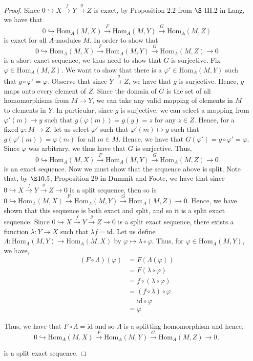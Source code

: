 \documentclass[11pt, reqno]{amsart}
\theoremstyle{plain}
\theoremstyle{definition}
\theoremstyle{example}
\def\Hom{\mathrm{Hom}}
\def\id{\mathrm{id}}
\begin{document}
\begin{proof}
Since $0 \hookrightarrow X \xrightarrow{f} Y \xrightarrow{g} Z$ is exact, by Proposition 2.2 from $\S$ III.2 in Lang, we have that $$0 \hookrightarrow \Hom_A(M,X) \xrightarrow{F} \Hom_A(M, Y) \xrightarrow{G} \Hom_A(M,Z)$$ is exact for all $A$-modules $M$. In order to show that $$0 \hookrightarrow \Hom_A(M,X) \xrightarrow{F} \Hom_A(M, Y) \xrightarrow{G} \Hom_A(M,Z) \to 0$$ is a short exact sequence, we thus need to show that $G$ is surjective. Fix $\varphi \in \Hom_A(M, Z)$. We want to show that there is a $\varphi' \in \Hom_A(M, Y)$ such that $g \circ \varphi' = \varphi$. Observe that since $Y \xrightarrow{g} Z$, we have that $g$ is surjective. Hence, $g$ maps onto every element of $Z$. Since the domain of $G$ is the set of all homomorphisms from $M \to Y$, we can take any valid mapping of elements in $M$ to elements in $Y$. In particular, since $g$ is surjective, we can select a mapping from $\varphi'(m) \mapsto y$ such that $g(\varphi(m)) = g(y) = z$ for any $z \in Z$. Hence, for a fixed $\varphi: M \to Z$, let us select $\varphi'$ such that $\varphi'(m) \mapsto y$ such that $g(\varphi'(m)) = \varphi(m)$ for all $m \in M$. Hence, we have that $G(\varphi')= g \circ \varphi' = \varphi$. Since $\varphi$ was arbitrary, we thus have that $G$ is surjective. Thus, $$0 \hookrightarrow \Hom_A(M,X) \xrightarrow{F} \Hom_A(M, Y) \xrightarrow{G} \Hom_A(M,Z) \to 0$$ is an exact sequence. Now we must show that the sequence above is split. Note that, by $\S 10.5$, Proposition 29 in Dummit and Foote, we have that since $0 \hookrightarrow X \xrightarrow{f} Y \xrightarrow{g} Z \to 0$ is a split sequence, then so is $0 \hookrightarrow \Hom_A(M,X) \xrightarrow{F} \Hom_A(M, Y) \xrightarrow{G} \Hom_A(M,Z) \to 0$. Hence, we have shown that this sequence is both exact and split, and so it is a split exact sequence. Since $0 \hookrightarrow X \xrightarrow{f} Y \xrightarrow{g} Z \to 0$ is a split exact sequence, there exists a function $\lambda: Y \to X$ such that $\lambda f = \id$. Let us define $\Lambda: \Hom_A(M, Y) \to \Hom_A(M, X)$ by $\varphi \mapsto \lambda \circ \varphi$. Thus, for $\varphi \in \Hom_A(M, Y)$, we have,
\begin{align*}
(F \circ \Lambda)(\varphi) &= F(\Lambda(\varphi))\\
&= F(\lambda \circ \varphi)\\
&= f \circ (\lambda \circ \varphi)\\
&= (f \circ \lambda) \circ \varphi\\
&= \id \circ \varphi\\
&= \varphi
\end{align*}

Thus, we have that $F \circ \Lambda = \id$ and so $\Lambda$ is a splitting homomorphism and hence, $$0 \hookrightarrow \Hom_A(M,X) \xrightarrow{F} \Hom_A(M, Y) \xrightarrow{G} \Hom_A(M,Z) \to 0,$$

is a split exact sequence.
\end{proof}
\end{document}
